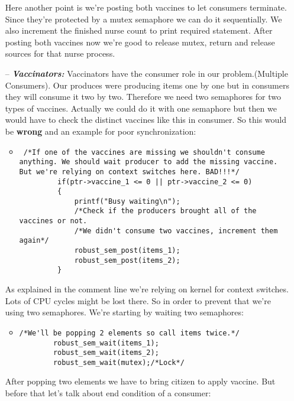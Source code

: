 \documentclass{article}
\begin{document}
\begin{itemize}
Here another point is we're posting both vaccines to let consumers terminate. Since they're protected by a mutex semaphore we can do it sequentially. We also increment the finished nurse count to print required statement. After posting both vaccines now we're good to release mutex, return and release sources for that nurse process.

\newpage
 
\item[--] \textbf{\textit{Vaccinators:}} Vaccinators have the consumer role in our problem.(Multiple Consumers). Our produces were producing items one by one but in consumers they will consume it two by two. Therefore we need two semaphores for two types of vaccines. Actually we could do it with one semaphore but then we would have to check the distinct vaccines like this in consumer. So this would be \textbf{wrong} and an example for poor synchronization: 
\begin{itemize}
    \item 
    \begin{lstlisting}
 /*If one of the vaccines are missing we shouldn't consume anything. We should wait producer to add the missing vaccine. But we're relying on context switches here. BAD!!!*/
         if(ptr->vaccine_1 <= 0 || ptr->vaccine_2 <= 0)
         {
             printf("Busy waiting\n");
             /*Check if the producers brought all of the vaccines or not. 
             /*We didn't consume two vaccines, increment them again*/
             robust_sem_post(items_1);
             robust_sem_post(items_2);
         }
    \end{lstlisting}
\end{itemize}

As explained in the comment line we're relying on kernel for context switches. Lots of CPU cycles might be lost there. So in order to prevent that we're using two semaphores. We're starting by waiting two semaphores:
\begin{itemize}
    \item 
    \begin{lstlisting}
/*We'll be popping 2 elements so call items twice.*/
        robust_sem_wait(items_1);
        robust_sem_wait(items_2);
        robust_sem_wait(mutex);/*Lock*/
    \end{lstlisting}
\end{itemize}

After popping two elements we have to bring citizen to apply vaccine. But before that let's talk about end condition of a consumer:


\end{itemize}
\end{document}
